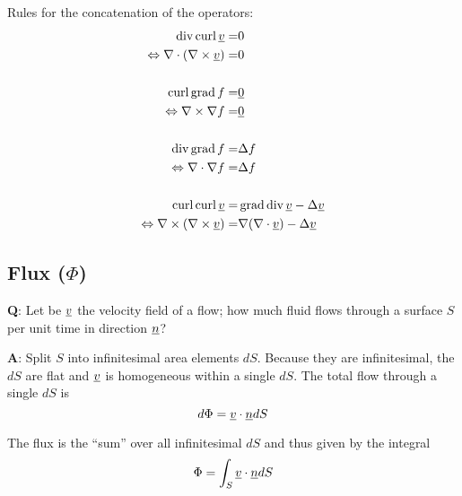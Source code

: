 Rules for the concatenation of the operators:
\[
\begin{aligned}
	\operatorname*{div} \operatorname*{curl} \underline{v} = &  0 \\
	\Leftrightarrow \nabla \cdot ( \nabla \times\underline{v} ) = &  0 \\
	\\
	\operatorname*{curl} \operatorname*{grad} f = &  \underline{0} \\
	\Leftrightarrow \nabla \times \nabla f = & \underline{0}\\
	\\
	\operatorname*{div} \operatorname*{grad} f = & \Delta f \\
	\Leftrightarrow \nabla \cdot \nabla f = &  \Delta f\\
	\\
	\operatorname*{curl} \operatorname*{curl} \underline{v} = & \operatorname*{grad}  \operatorname*{div} \underline{v} - \Delta \underline{v} \\
	\Leftrightarrow \nabla \times (\nabla \times \underline{v}) =  & \nabla  (\nabla \cdot \underline{v}) - \Delta \underline{v}\\
\end{aligned}
\]



\subsection*{Flux ($\Phi$)}

\textbf{Q}: Let be $\underline{v}$ the velocity field of a flow;
how much fluid flows through a surface $S$ per unit time in direction $\underline{n}$?

\textbf{A}: Split $S$ into infinitesimal area elements $dS$. 
Because they are infinitesimal, the $dS$ are flat and $\underline{v}$ is homogeneous within a single $dS$.
The total flow through a single $dS$ is
\[
	d\Phi = \underline{v} \cdot \underline{n} dS
\]

The flux is the “sum” over all infinitesimal $dS$ and thus given by the integral
\[
	\Phi = \int_S \underline{v} \cdot \underline{n} dS
\]






